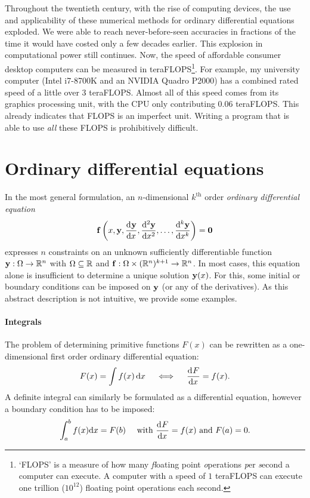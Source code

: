 Throughout the twentieth century, with the rise of computing devices, the use and applicability of these numerical methods for ordinary differential equations exploded. We were able to reach never-before-seen accuracies in fractions of the time it would have costed only a few decades earlier. This explosion in computational power still continues. Now, the speed of affordable consumer desktop computers can be measured in teraFLOPS\footnote{`FLOPS' is a measure of how many \emph{fl}oating point \emph{o}perations \emph{p}er \emph{s}econd a computer can execute. A computer with a speed of $1$ teraFLOPS can execute one trillion ($10^{12}$) floating point operations each second.}. For example, my university computer (Intel i7-8700K and an NVIDIA Quadro P2000) has a combined rated speed of a little over 3 teraFLOPS. Almost all of this speed comes from its graphics processing unit, with the CPU only contributing $0.06$ teraFLOPS. This already indicates that FLOPS is an imperfect unit. Writing a program that is able to use \emph{all} these FLOPS is prohibitively difficult.

\section{Ordinary differential equations}

In the most general formulation, an $n$-dimensional $k^\text{th}$ order \emph{ordinary differential equation}
\begin{equation}\label{equ:c1_ode_def}
    \vb{f}\left(x, \vb{y}, {\dv[]{\vb{y}}{x}}, {\dv[2]{\vb{y}}{x}}, \dots, {\dv[k]{\vb{y}}{x}}\right) = \vb{0}
\end{equation}
expresses $n$ constraints on an unknown sufficiently differentiable function $\vb{y} : \Omega \to \mathbb{R}^n$ with $\Omega \subseteq \mathbb{R}$ and $\vb{f}: \Omega \times (\mathbb{R}^n)^{k+1} \to \mathbb{R}^n$. In most cases, this equation alone is insufficient to determine a unique solution $\vb{y}(x)$. For this, some initial or boundary conditions can be imposed on $\vb{y}$ (or any of the derivatives). As this abstract description is not intuitive, we provide some examples.

\paragraph{Integrals} The problem of determining primitive functions $F(x)$ can be rewritten as a one-dimensional first order ordinary differential equation:
$$
    F(x) = \int f(x) \,\dd x \quad \iff \quad \dv[]{F}{x} = f(x)\text{.}
$$
A definite integral can similarly be formulated as a differential equation, however a boundary condition has to be imposed:
$$
    \int_a^b f(x) \dd x = F(b) \quad \text{ with } \dv[]{F}{x} = f(x) \text{ and } F(a) = 0\text{.}
$$

